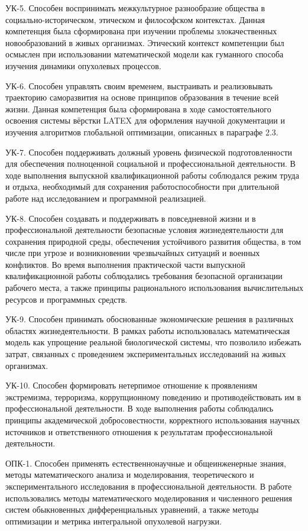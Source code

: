 УК-5. Способен воспринимать межкультурное разнообразие общества в
социально-историческом, этическом и философском контекстах. Данная компетенция
была сформирована при изучении проблемы злокачественных новообразований в живых
организмах. Этический контекст компетенции был осмыслен при использовании
математической модели как гуманного способа изучения динамики опухолевых процессов.

УК-6. Способен управлять своим временем, выстраивать и реализовывать траекторию
саморазвития на основе принципов образования в течение всей жизни. Данная
компетенция была сформирована в ходе самостоятельного освоения системы вёрстки
LATEX для оформления научной документации и изучения алгоритмов глобальной
оптимизации, описанных в параграфе 2.3.

УК-7. Способен поддерживать должный уровень физической подготовленности для
обеспечения полноценной социальной и профессиональной деятельности. В ходе
выполнения выпускной квалификационной работы соблю­дался режим труда и отдыха,
необходимый для сохранения работоспособно­сти при длительной работе над
исследованием и программной реализацией.

УК-8. Способен создавать и поддерживать в повседневной жизни и в
профессиональной деятельности безопасные условия жизнедеятельности для
сохранения природной среды, обеспечения устойчивого развития общества, в
том числе при угрозе и возникновении чрезвычайных ситуаций и военных
конфликтов. Во время выполнения практической части выпускной квалификационной работы
соблюдались требования безопасной организации рабочего места, а также принципы
рационального использования вычислительных ресурсов и программных средств.

УК-9. Способен принимать обоснованные экономические решения в
различных областях жизнедеятельности. В рамках работы использовалась
математическая модель как упрощение реальной биологической системы, что
позволило избежать затрат, связанных с проведением экспериментальных
исследований на живых организмах.

УК-10. Способен формировать нетерпимое отношение к проявлениям
экстремизма, терроризма, коррупционному поведению и противодействовать
им в профессиональной деятельности. В ходе выполнения работы соблюда­лись
принципы академической добросовестности, корректного использования
научных источников и ответственного отношения к результатам профессио­нальной
деятельности.

ОПК-1. Способен применять естественнонаучные и общеинженерные знания,
методы математического анализа и моделирования, теоретического и
экспериментального исследования в профессиональной деятельности. В работе
использовались методы математического моделирования и численного решения систем
обыкновенных дифференциальных уравнений, а также методы оптимизации и метрика
интегральной опухолевой нагрузки.

